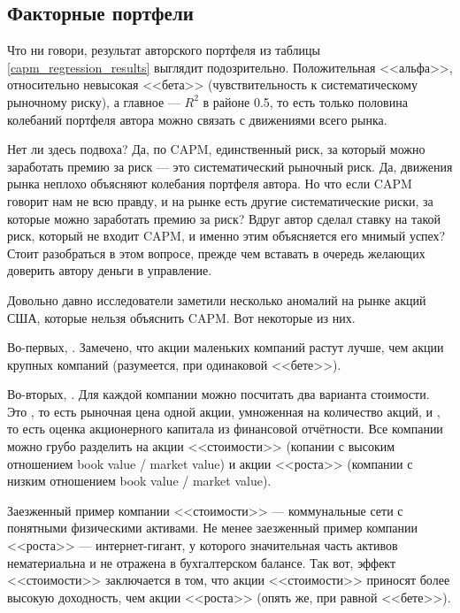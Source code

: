 \subsection{Факторные портфели}

Что ни говори, результат авторского портфеля из таблицы \ref{capm_regression_results} выглядит подозрительно. Положительная <<альфа>>, относительно невысокая <<бета>> (чувствительность к систематическому рыночному риску), а главное --- $R^2$ в районе 0.5, то есть только половина колебаний портфеля автора можно связать с движениями всего рынка.

Нет ли здесь подвоха? Да, по CAPM, единственный риск, за который можно заработать премию за риск --- это систематический рыночный риск. Да, движения рынка неплохо объясняют колебания портфеля автора. Но что если CAPM говорит нам не всю правду, и на рынке есть другие систематические риски, за которые можно заработать премию за риск? Вдруг автор сделал ставку на такой риск, который не входит CAPM, и именно этим объясняется его мнимый успех? Стоит разобраться в этом вопросе, прежде чем вставать в очередь желающих доверить автору деньги в управление.

Довольно давно исследователи заметили несколько аномалий на рынке акций США, которые нельзя объяснить CAPM. Вот некоторые из них.

Во-первых, . Замечено, что акции маленьких компаний растут лучше, чем акции крупных компаний (разумеется, при одинаковой <<бете>>).

Во-вторых, . Для каждой компании можно посчитать два варианта стоимости. Это , то есть рыночная цена одной акции, умноженная на количество акций, и , то есть оценка акционерного капитала из финансовой отчётности. Все компании можно грубо разделить на акции <<стоимости>> (копании с высоким отношением book value / market value) и акции <<роста>> (компании с низким отношением book value / market value).

Заезженный пример компании <<стоимости>> --- коммунальные сети с понятными физическими активами. Не менее заезженный пример компании <<роста>> --- интернет-гигант, у которого значительная часть активов нематериальна и не отражена в бухгалтерском балансе. Так вот, эффект <<стоимости>> заключается в том, что акции <<стоимости>> приносят более высокую доходность, чем акции <<роста>> (опять же, при равной <<бете>>).

